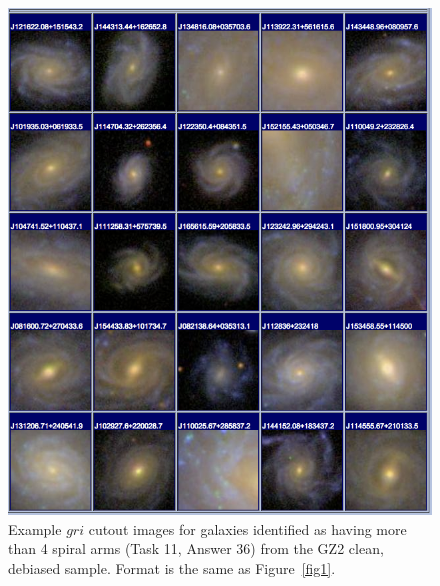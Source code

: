 \documentclass[useAMS,usenatbib]{mn2e}
\begin{document}
\newpage
\clearpage
\begin{figure}
\includegraphics[angle=0,width=7.0in]{figures/gallery/spiralmorethan4.png}
\caption{Example $gri$ cutout images for galaxies identified as having more than 4 spiral arms (Task 11, Answer 36) from the GZ2 clean, debiased sample. Format is the same as Figure~\ref{fig1}.}
\end{figure}
\end{document}
